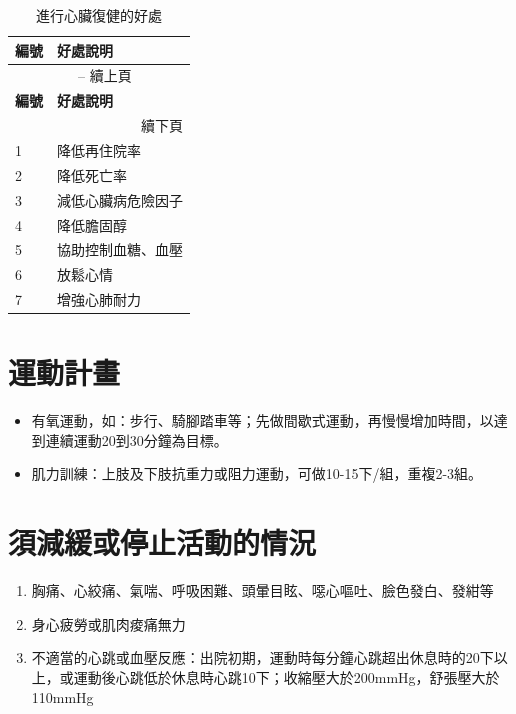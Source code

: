 \documentclass[nols]{tufte-book}
\begin{document}
\begin{longtable}{p{}p{}}
\caption{進行心臟復健的好處} \label{tab:benefits} \\
\hline
\textbf{編號} & \textbf{好處說明} \\
\hline
\endfirsthead

\multicolumn{2}{c}{\tablename\ \thetable{} -- 續上頁} \\
\hline
\textbf{編號} & \textbf{好處說明} \\
\hline
\endhead

\hline
\multicolumn{2}{r}{續下頁} \\
\endfoot

\hline
\endlastfoot

1 & 降低再住院率 \\
\hline
2 & 降低死亡率 \\
\hline
3 & 減低心臟病危險因子 \\
\hline
4 & 降低膽固醇 \\
\hline
5 & 協助控制血糖、血壓 \\
\hline
6 & 放鬆心情 \\
\hline
7 & 增強心肺耐力 \\

\end{longtable}



\newpage
\section*{運動計畫}
\begin{itemize}
  \item 有氧運動，如：步行、騎腳踏車等；先做間歇式運動，再慢慢增加時間，以達到連續運動20到30分鐘為目標。
  \item 肌力訓練：上肢及下肢抗重力或阻力運動，可做10-15下/組，重複2-3組。
\end{itemize}

\section*{須減緩或停止活動的情況}
\begin{enumerate}
  \item 胸痛、心絞痛、氣喘、呼吸困難、頭暈目眩、噁心嘔吐、臉色發白、發紺等
  \item 身心疲勞或肌肉痠痛無力
  \item 不適當的心跳或血壓反應：出院初期，運動時每分鐘心跳超出休息時的20下以上，或運動後心跳低於休息時心跳10下；收縮壓大於200mmHg，舒張壓大於110mmHg
\end{enumerate}
\end{document}

